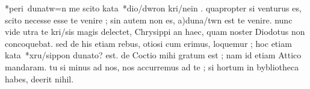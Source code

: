 


*peri\ dunatw=n me scito kata\ *dio/dwron kri/nein . quapropter si venturus es, scito necesse esse te venire ; sin autem non es, a)duna/twn est te venire. nunc vide utra te kri/sis magis delectet, Chrysippi an haec, quam noster Diodotus non concoquebat. sed de his etiam rebus, otiosi cum erimus,
loquemur ; hoc etiam kata\ *xru/sippon dunato\n ? est. de Coctio mihi gratum est ; nam id etiam Attico mandaram. tu si minus ad nos, nos accurremus ad te ; si hortum in bybliotheca habes, deerit nihil.
